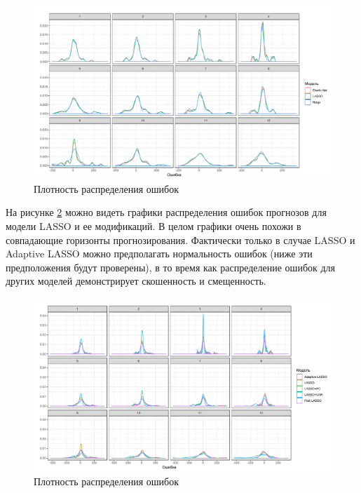 \begin{figure}[hp]
    \centering
    \includegraphics[width = \textwidth]{error1.pdf}
    \caption{Плотность распределения ошибок}
    \label{fig:error1}
\end{figure}
На рисунке \ref{fig:error2} можно видеть графики распределения ошибок прогнозов для модели LASSO и ее модификаций. В целом графики очень похожи в совпадающие горизонты прогнозирования. Фактически только в случае LASSO и Adaptive LASSO можно предполагать нормальность ошибок (ниже эти предположения будут проверены), в то время как распределение ошибок для других моделей демонстрирует скошенность и смещенность.


\begin{figure}[hp]
    \centering
    \includegraphics[width = \textwidth]{error2.pdf}
    \caption{Плотность распределения ошибок}
    \label{fig:error2}
\end{figure}


